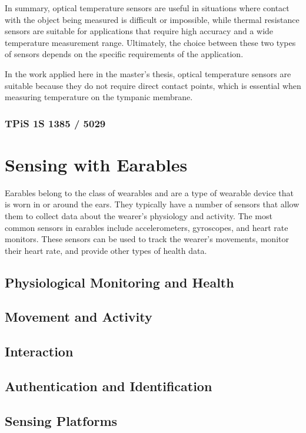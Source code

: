 In summary, optical temperature sensors are useful in situations where contact with the object being measured is difficult or impossible, while thermal resistance sensors are suitable for applications that require high accuracy and a wide temperature measurement range. 
Ultimately, the choice between these two types of sensors depends on the specific requirements of the application.

In the work applied here in the master's thesis, optical temperature sensors are suitable because they do not require direct contact points, which is essential when measuring temperature on the tympanic membrane.

\subsubsection{TPiS 1S 1385 / 5029}

\section{Sensing with Earables}
Earables belong to the class of wearables and are a type of wearable device that is worn in or around the ears. 
They typically have a number of sensors that allow them to collect data about the wearer's physiology and activity. 
The most common sensors in earables include accelerometers, gyroscopes, and heart rate monitors. These sensors can be used to track the wearer's movements, monitor their heart rate, and provide other types of health data.

\subsection{Physiological Monitoring and Health}
\subsection{Movement and Activity}
\subsection{Interaction}
\subsection{Authentication and Identification}

\subsection{Sensing Platforms}




